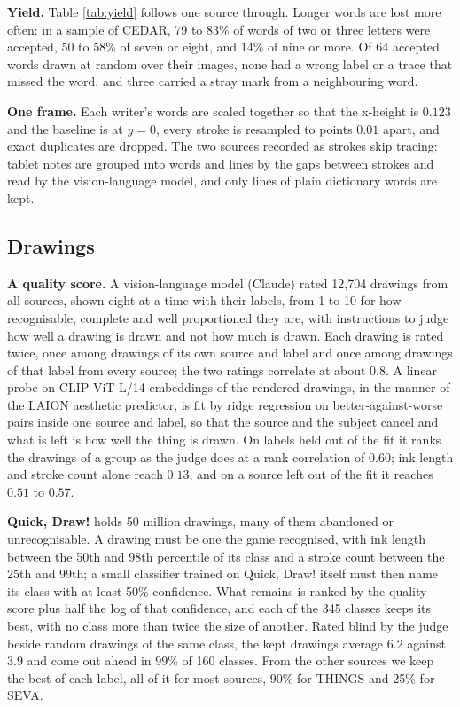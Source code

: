 \documentclass{article}
\begin{document}
\textbf{Yield.} Table \ref{tab:yield} follows one source through. Longer words are lost more often: in a sample of CEDAR, 79 to 83\% of words of two or three letters were accepted, 50 to 58\% of seven or eight, and 14\% of nine or more. Of 64 accepted words drawn at random over their images, none had a wrong label or a trace that missed the word, and three carried a stray mark from a neighbouring word.

\textbf{One frame.} Each writer's words are scaled together so that the x-height is $0.123$ and the baseline is at $y=0$, every stroke is resampled to points $0.01$ apart, and exact duplicates are dropped. The two sources recorded as strokes skip tracing: tablet notes are grouped into words and lines by the gaps between strokes and read by the vision-language model, and only lines of plain dictionary words are kept.

\subsection{Drawings}

\textbf{A quality score.} A vision-language model (Claude) rated 12,704 drawings from all sources, shown eight at a time with their labels, from 1 to 10 for how recognisable, complete and well proportioned they are, with instructions to judge how well a drawing is drawn and not how much is drawn. Each drawing is rated twice, once among drawings of its own source and label and once among drawings of that label from every source; the two ratings correlate at about $0.8$. A linear probe on CLIP ViT-L/14 embeddings of the rendered drawings, in the manner of the LAION aesthetic predictor, is fit by ridge regression on better-against-worse pairs inside one source and label, so that the source and the subject cancel and what is left is how well the thing is drawn. On labels held out of the fit it ranks the drawings of a group as the judge does at a rank correlation of $0.60$; ink length and stroke count alone reach $0.13$, and on a source left out of the fit it reaches $0.51$ to $0.57$.

\textbf{Quick, Draw!} holds 50 million drawings, many of them abandoned or unrecognisable. A drawing must be one the game recognised, with ink length between the 50th and 98th percentile of its class and a stroke count between the 25th and 99th; a small classifier trained on Quick, Draw! itself must then name its class with at least 50\% confidence. What remains is ranked by the quality score plus half the log of that confidence, and each of the 345 classes keeps its best, with no class more than twice the size of another. Rated blind by the judge beside random drawings of the same class, the kept drawings average $6.2$ against $3.9$ and come out ahead in 99\% of 160 classes. From the other sources we keep the best of each label, all of it for most sources, 90\% for THINGS and 25\% for SEVA.
\end{document}
